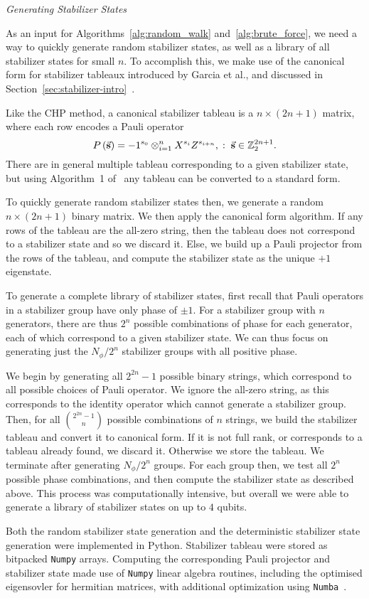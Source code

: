 \clearpage
\par\large{\itshape{Generating Stabilizer States}}\par
As an input for Algorithms~\ref{alg:random_walk} and~\ref{alg:brute_force}, we need a way to quickly generate random stabilizer states, as well as a library of all stabilizer states for small $n$. To accomplish this, we make use of the canonical form for stabilizer tableaux introduced by Garcia et al., and discussed in Section~\ref{sec:stabilizer-intro}~\cite{Garcia2012}.\par
Like the CHP method, a canonical stabilizer tableau is a $n \times \left(2n+1\right)$ matrix, where each row encodes a Pauli operator
\[P\left(\va{s}\right)=-1^{s_{0}}\otimes_{i=1}^{n}X^{s_{i}}Z^{s_{i+n}},\;:\;\va{s}\in\mathbb{Z}_{2}^{2n+1}.\]
There are in general multiple tableau corresponding to a given stabilizer state, but using Algorithm~1 of~\cite{Garcia2012} any tableau can be converted to a standard form.\par
To quickly generate random stabilizer states then, we generate a random $n \times \left(2n+1\right)$ binary matrix. We then apply the canonical form algorithm. If any rows of the tableau are the all-zero string, then the tableau does not correspond to a stabilizer state and so we discard it. Else, we build up a Pauli projector from the rows of the tableau, and compute the stabilizer state as the unique $+1$ eigenstate.\par
To generate a complete library of stabilizer states, first recall that Pauli operators in a stabilizer group have only phase of $\pm 1$. For a stabilizer group with $n$ generators, there are thus $2^{n}$ possible combinations of phase for each generator, each of which correspond to a given stabilizer state. We can thus focus on generating just the $N_{\phi}/2^{n}$ stabilizer groups with all positive phase.\par
We begin by generating all $2^{2n}-1$ possible binary strings, which correspond to all possible choices of Pauli operator. We ignore the all-zero string, as this corresponds to the identity operator which cannot generate a stabilizer group. Then, for all $\binom{2^{2n}-1}{n}$ possible combinations of $n$ strings, we build the stabilizer tableau and convert it to canonical form. If it is not full rank, or corresponds to a tableau already found, we discard it. Otherwise we store the tableau. We terminate after generating $N_{\phi}/2^{n}$ groups. For each group then, we test all $2^{n}$ possible phase combinations, and then compute the stabilizer state as described above. This process was computationally intensive, but overall we were able to generate a library of stabilizer states on up to $4$ qubits.\par
Both the random stabilizer state generation and the deterministic stabilizer state generation were implemented in Python. Stabilizer tableau were stored as bitpacked \texttt{Numpy} arrays. Computing the corresponding Pauli projector and stabilizer state made use of \texttt{Numpy} linear algebra routines, including the optimised eigensovler for hermitian matrices, with additional optimization using \texttt{Numba}~\cite{Numpy,Numba}.
